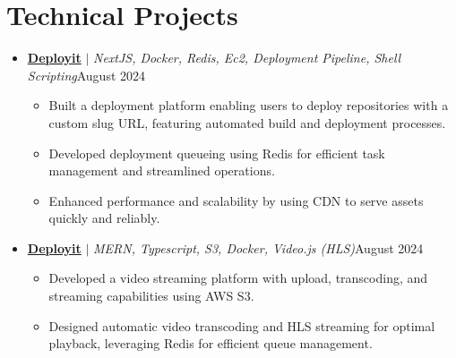 \documentclass[letterpaper,11pt]{article}
\begin{document}
\section{Technical Projects}
\vspace{-1pt}
\begin{itemize}[leftmargin=*,itemsep=2pt,parsep=0pt,topsep=0pt,partopsep=0pt]

	\item \textbf{\href{https://deployit.live/}{Deployit}} $|$ \emph{NextJS, Docker, Redis, Ec2, Deployment Pipeline, Shell Scripting}\hfill {August 2024}
	      \begin{itemize}[leftmargin=*,itemsep=1pt,parsep=0pt,topsep=0pt,partopsep=0pt]
		      \item Built a deployment platform enabling users to deploy repositories with a custom
		            slug URL, featuring automated build and deployment processes.
		      \item Developed deployment queueing using Redis for efficient task management and
		            streamlined operations.
		      \item Enhanced performance and scalability by using CDN to serve assets quickly and
		            reliably.
	      \end{itemize}

	\item \textbf{{\href{https://github.com/Pulkitxm/VidWave}{Deployit}}} $|$ \emph{MERN, Typescript, S3, Docker, Video.js (HLS)}\hfill {August 2024}
	      \begin{itemize}[leftmargin=*,itemsep=1pt,parsep=0pt,topsep=0pt,partopsep=0pt]
		      \item Developed a video streaming platform with upload, transcoding, and streaming
		            capabilities using AWS S3.
		      \item Designed automatic video transcoding and HLS streaming for optimal playback,
		            leveraging Redis for efficient queue management.
	      \end{itemize}

\end{itemize}
\vspace{-8pt}
\end{document}
